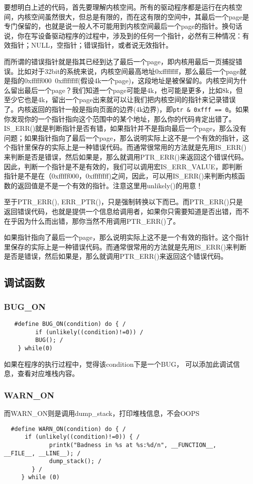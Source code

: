 				要想明白上述的代码，首先要理解内核空间。所有的驱动程序都是运行在内核空间，内核空间虽然很大，但总是有限的，而在这有限的空间中，其最后一个page是专门保留的，也就是说一般人不可能用到内核空间最后一个page的指针。换句话说，你在写设备驱动程序的过程中，涉及到的任何一个指针，必然有三种情况：有效指针；NULL，空指针；错误指针，或者说无效指针。

				而所谓的错误指针就是指其已经到达了最后一个page，即内核用最后一页捕捉错误。比如对于32bit的系统来说，内核空间最高地址0xffffffff，那么最后一个page就是指的0xfffff000~0xffffffff(假设4k一个page)，这段地址是被保留的。内核空间为什么留出最后一个page？我们知道一个page可能是4k，也可能是更多，比如8k，但至少它也是4k，留出一个page出来就可以让我们把内核空间的指针来记录错误了。内核返回的指针一般是指向页面的边界(4k边界)，即\texttt{ptr & 0xfff == 0}。如果你发现你的一个指针指向这个范围中的某个地址，那么你的代码肯定出错了。IS\_ERR()就是判断指针是否有错，如果指针并不是指向最后一个page，那么没有问题；如果指针指向了最后一个page，那么说明实际上这不是一个有效的指针，这个指针里保存的实际上是一种错误代码。而通常很常用的方法就是先用IS\_ERR()来判断是否是错误，然后如果是，那么就调用PTR\_ERR()来返回这个错误代码。因此，判断一个指针是不是有效的，我们可以调用宏IS\_ERR\_VALUE，即判断指针是不是在（0xfffff000，0xffffffff)之间，因此，可以用IS\_ERR()来判断内核函数的返回值是不是一个有效的指针。注意这里用unlikely()的用意！

				至于PTR\_ERR(), ERR\_PTR()，只是强制转换以下而已。而PTR\_ERR()只是返回错误代码，也就是提供一个信息给调用者，如果你只需要知道是否出错，而不在乎因为什么而出错，那你当然不用调用PTR\_ERR()了。

				如果指针指向了最后一个page，那么说明实际上这不是一个有效的指针。这个指针里保存的实际上是一种错误代码。而通常很常用的方法就是先用IS\_ERR()来判断是否是错误，然后如果是，那么就调用PTR\_ERR()来返回这个错误代码。
		\subsection{调试函数}
			\subsubsection{BUG\_ON}
\begin{verbatim}
   #define BUG_ON(condition) do { /
         if (unlikely((condition)!=0)) /
         BUG(); /
    } while(0)
\end{verbatim}
    			如果在程序的执行过程中，觉得该condition下是一个BUG，
				可以添加此调试信息，查看对应堆栈内容。
			\subsubsection{WARN\_ON}			
    			而WARN\_ON则是调用dump\_stack，打印堆栈信息，不会OOPS
\begin{verbatim}
  #define WARN_ON(condition) do { /
      if (unlikely((condition)!=0)) { /
             printk("Badness in %s at %s:%d/n", __FUNCTION__, __FILE__, __LINE__); /
             dump_stack(); /
        } /
     } while (0)
\end{verbatim}

